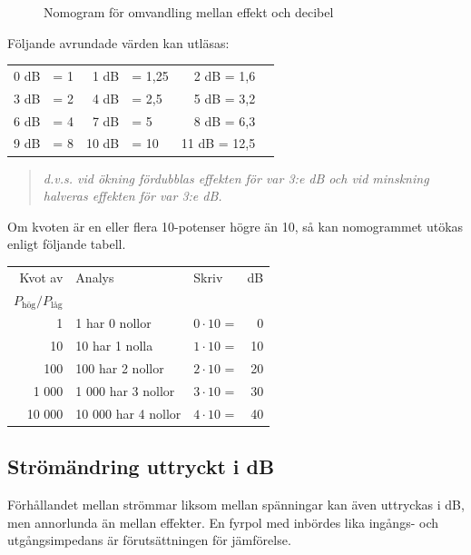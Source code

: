 \begin{figure}
  \caption{Nomogram för omvandling mellan effekt och decibel}
  \label{ellära-nomogram-db-effekt}
\end{figure}

Följande avrundade värden kan utläsas:

\begin{tabular}{rlrlrl}
0 dB & = 1 &  1 dB & =  1,25 & 2 dB = 1,6 \\
3 dB & = 2 &  4 dB & =  2,5  & 5 dB = 3,2 \\
6 dB & = 4 &  7 dB & =  5    & 8 dB = 6,3 \\
9 dB & = 8 & 10 dB & = 10    & 11 dB = 12,5
\end{tabular}

\begin{quote}\emph{
d.v.s. vid ökning fördubblas effekten för var 3:e dB och vid minskning
halveras effekten för var 3:e dB.
}\end{quote}

Om kvoten är en eller flera 10-potenser högre än 10, så kan nomogrammet utökas
enligt följande tabell.

\begin{tabular}{rllr}
Kvot av & Analys             & Skriv            & dB \\
\(P_\text{hög}/P_\text{låg}\) &          &                  &    \\
     1 & 1 har 0 nollor      & \(0 \cdot 10\) = &  0 \\
    10 & 10 har 1 nolla      & \(1 \cdot 10\) = & 10 \\
   100 & 100 har 2 nollor    & \(2 \cdot 10\) = & 20 \\
 1 000 &  1 000 har 3 nollor & \(3 \cdot 10\) = & 30 \\
10 000 & 10 000 har 4 nollor & \(4 \cdot 10\) = & 40
\end{tabular}

\subsection{Strömändring uttryckt i dB}

Förhållandet mellan strömmar liksom mellan spänningar kan även uttryckas i dB,
men annorlunda än mellan effekter. En fyrpol med inbördes lika ingångs- och utgångsimpedans är förutsättningen för jämförelse.


